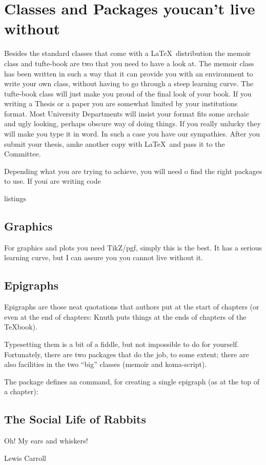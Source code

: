 \chapter{Classes and Packages you\hfill \protect\break can't live without\hfill}

Besides the standard classes that come with a \LaTeX\ distribution the memoir class and tufte-book are two that you need to have a look at. The memoir class has been written in such a way that it can provide you with an environment to write your own class, without having to go through a steep learning curve. The tufte-book class will just make you  proud of the final look of your book. If you writing a Thesis or a paper you are somewhat limited by your institutions format. Most University Departments will insist your format fits some archaic and ugly looking, perhaps obscure way of doing things. If you really unlucky they will make you type it in word. In such a case you have our sympathies. After you submit your thesis, amke another copy with \LaTeX\ and pass it to the Committee.

Depending what you are trying to achieve, you will need o find the right packages to use. If youi are writing code

listings


\section*{Graphics}
For graphics and plots you need TikZ/pgf, simply this is the best. It has a serious learning curve, but I can assure you you cannot live without it.

\section{Epigraphs}


Epigraphs are those neat quotations that authors put at the start of chapters (or even at the end of chapters: Knuth puts things at the ends of chapters of the \TeX book).

Typesetting them is a bit of a fiddle, but not impossible to do for yourself. Fortunately, there are two packages that do the job, to some extent; there are also facilities in the two ``big'' classes (memoir and koma-script).

The  package defines an  command, for creating a single epigraph (as at the top of a chapter):

\begin{Code}
\chapter{The Social Life of Rabbits}
\epigraph{Oh!  My ears and whiskers!}%
         {Lewis Carroll}
\end{Code}

